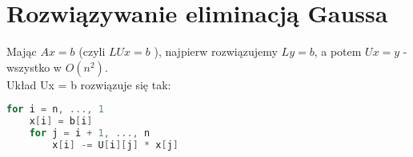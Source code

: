 \section{Rozwiązywanie eliminacją Gaussa}
Mając \( Ax = b \) (czyli \( LUx = b \) ), najpierw rozwiązujemy \( Ly = b \), a
potem \( Ux = y \) - wszystko w \( O(n^2) \). \\
Układ Ux = b rozwiązuje się tak:
\begin{lstlisting}[language=Cpp]
for i = n, ..., 1
    x[i] = b[i]
    for j = i + 1, ..., n
        x[i] -= U[i][j] * x[j]
\end{lstlisting}